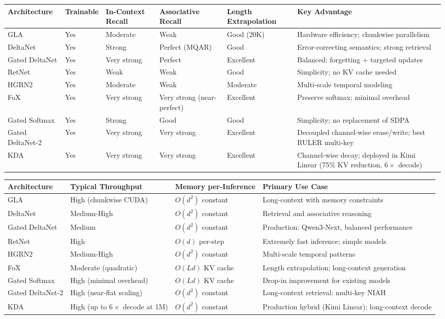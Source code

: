\footnotesize
\begin{longtable}{p{1.8cm}p{2.0cm}p{2.2cm}p{2.2cm}p{2.2cm}p{1.8cm}}
\toprule
\textbf{Architecture} & \textbf{Trainable} & \textbf{In-Context Recall} & \textbf{Associative Recall} & \textbf{Length Extrapolation} & \textbf{Key Advantage} \\
\midrule
\endhead
GLA & Yes & Moderate & Weak & Good (20K) & Hardware efficiency; chunkwise parallelism \\
DeltaNet & Yes & Strong & Perfect (MQAR) & Good & Error-correcting semantics; strong retrieval \\
Gated DeltaNet & Yes & Very strong & Perfect & Excellent & Balanced: forgetting + targeted updates \\
RetNet & Yes & Weak & Weak & Good & Simplicity; no KV cache needed \\
HGRN2 & Yes & Moderate & Weak & Moderate & Multi-scale temporal modeling \\
FoX & Yes & Very strong & Very strong (near-perfect) & Excellent & Preserve softmax; minimal overhead \\
Gated Softmax & Yes & Strong & Good & Good & Simplicity; no replacement of SDPA \\
Gated DeltaNet-2 & Yes & Very strong & Very strong & Excellent & Decoupled channel-wise erase/write; best RULER multi-key \\
KDA & Yes & Very strong & Very strong & Excellent & Channel-wise decay; deployed in Kimi Linear (75\% KV reduction, $6\times$ decode) \\
\bottomrule
\end{longtable}
\normalsize

\medskip

\footnotesize
\begin{longtable}{p{2.0cm}p{2.4cm}p{2.8cm}p{3.4cm}}
\toprule
\textbf{Architecture} & \textbf{Typical Throughput} & \textbf{Memory per-Inference} & \textbf{Primary Use Case} \\
\midrule
\endhead
GLA & High (chunkwise CUDA) & $O(d^2)$ constant & Long-context with memory constraints \\
DeltaNet & Medium-High & $O(d^2)$ constant & Retrieval and associative reasoning \\
Gated DeltaNet & Medium & $O(d^2)$ constant & Production: Qwen3-Next, balanced performance \\
RetNet & High & $O(d)$ per-step & Extremely fast inference; simple models \\
HGRN2 & Medium-High & $O(d^2)$ constant & Multi-scale temporal patterns \\
FoX & Moderate (quadratic) & $O(Ld)$ KV cache & Length extrapolation; long-context generation \\
Gated Softmax & High (minimal overhead) & $O(Ld)$ KV cache & Drop-in improvement for existing models \\
Gated DeltaNet-2 & High (near-flat scaling) & $O(d^2)$ constant & Long-context retrieval; multi-key NIAH \\
KDA & High (up to $6\times$ decode at 1M) & $O(d^2)$ constant & Production hybrid (Kimi Linear); long-context decode \\
\bottomrule
\end{longtable}
\normalsize

